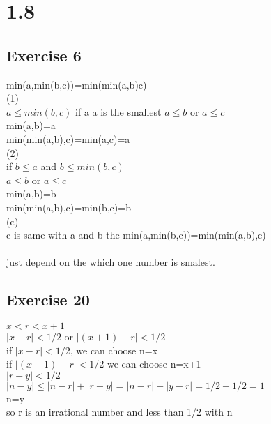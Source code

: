 \documentclass[12pt]{article}
\begin{document}
\section*{1.8}
\subsection*{Exercise 6}
min(a,min(b,c))=min(min(a,b)c)\\
(1)\\
$a\leq min(b,c)$
if a a is the smallest $a\leq b$ or $ a\leq c$ \\
min(a,b)=a\\
min(min(a,b),c)=min(a,c)=a\\

(2)\\
if $b\leq a$ and $ b\leq min(b,c)$ \\
$a\leq b$ or $ a\leq c$ \\
min(a,b)=b\\
min(min(a,b),c)=min(b,c)=b\\


(c)\\ 
c is same with a and b the min(a,min(b,c))=min(min(a,b),c)\\
\\
just depend on the which one number is smalest.\\
\subsection*{Exercise 20}
$x<r<x+1$\\
$|x-r|<1/2$ or $|(x+1)-r|<1/2$\\
if $|x-r|<1/2$, we can choose n=x\\
if $|(x+1)-r|<1/2$ we can choose n=x+1\\
$|r-y|<1/2$\\
$|n-y|\leq|n-r|+|r-y|=|n-r|+|y-r|=1/2+1/2=1$\\
n=y\\
so r is an irrational number and less than 1/2 with n\\
\end{document}
